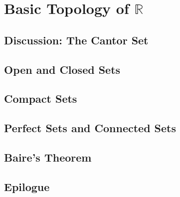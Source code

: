 \documentclass[class=understanding-analysis,crop=false]{standalone}
\begin{document}
\chapter{Basic Topology of $\mathbb{R}$}

\section{Discussion: The Cantor Set}

\section{Open and Closed Sets}

\section{Compact Sets}

\section{Perfect Sets and Connected Sets}

\section{Baire's Theorem}

\section{Epilogue}
\end{document}
